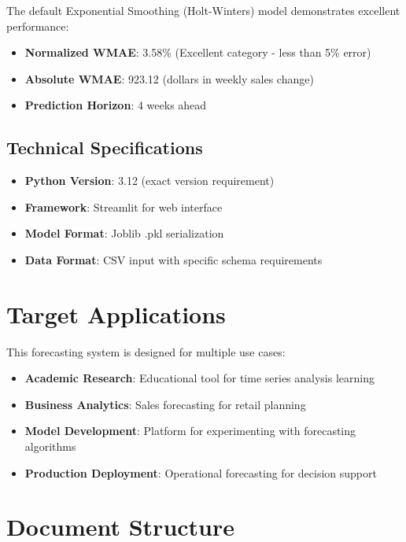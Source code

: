 The default Exponential Smoothing (Holt-Winters) model demonstrates excellent performance:

\begin{itemize}
    \item \textbf{Normalized WMAE}: 3.58\% (Excellent category - less than 5\% error)
    \item \textbf{Absolute WMAE}: 923.12 (dollars in weekly sales change)
    \item \textbf{Prediction Horizon}: 4 weeks ahead
\end{itemize}

\subsection{Technical Specifications}

\begin{itemize}
    \item \textbf{Python Version}: 3.12 (exact version requirement)
    \item \textbf{Framework}: Streamlit for web interface
    \item \textbf{Model Format}: Joblib .pkl serialization
    \item \textbf{Data Format}: CSV input with specific schema requirements
\end{itemize}

\section{Target Applications}

This forecasting system is designed for multiple use cases:

\begin{itemize}
    \item \textbf{Academic Research}: Educational tool for time series analysis learning
    \item \textbf{Business Analytics}: Sales forecasting for retail planning
    \item \textbf{Model Development}: Platform for experimenting with forecasting algorithms
    \item \textbf{Production Deployment}: Operational forecasting for decision support
\end{itemize}

\section{Document Structure}

